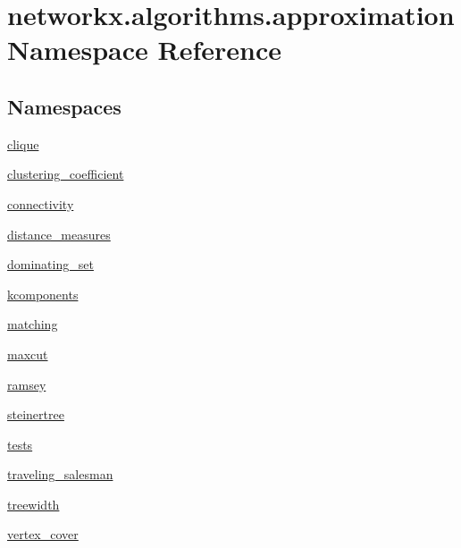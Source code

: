 \hypertarget{namespacenetworkx_1_1algorithms_1_1approximation}{}\section{networkx.\+algorithms.\+approximation Namespace Reference}
\label{namespacenetworkx_1_1algorithms_1_1approximation}
\subsection*{Namespaces}
\begin{DoxyCompactItemize}
\item 
 \hyperlink{namespacenetworkx_1_1algorithms_1_1approximation_1_1clique}{clique}
\item 
 \hyperlink{namespacenetworkx_1_1algorithms_1_1approximation_1_1clustering__coefficient}{clustering\+\_\+coefficient}
\item 
 \hyperlink{namespacenetworkx_1_1algorithms_1_1approximation_1_1connectivity}{connectivity}
\item 
 \hyperlink{namespacenetworkx_1_1algorithms_1_1approximation_1_1distance__measures}{distance\+\_\+measures}
\item 
 \hyperlink{namespacenetworkx_1_1algorithms_1_1approximation_1_1dominating__set}{dominating\+\_\+set}
\item 
 \hyperlink{namespacenetworkx_1_1algorithms_1_1approximation_1_1kcomponents}{kcomponents}
\item 
 \hyperlink{namespacenetworkx_1_1algorithms_1_1approximation_1_1matching}{matching}
\item 
 \hyperlink{namespacenetworkx_1_1algorithms_1_1approximation_1_1maxcut}{maxcut}
\item 
 \hyperlink{namespacenetworkx_1_1algorithms_1_1approximation_1_1ramsey}{ramsey}
\item 
 \hyperlink{namespacenetworkx_1_1algorithms_1_1approximation_1_1steinertree}{steinertree}
\item 
 \hyperlink{namespacenetworkx_1_1algorithms_1_1approximation_1_1tests}{tests}
\item 
 \hyperlink{namespacenetworkx_1_1algorithms_1_1approximation_1_1traveling__salesman}{traveling\+\_\+salesman}
\item 
 \hyperlink{namespacenetworkx_1_1algorithms_1_1approximation_1_1treewidth}{treewidth}
\item 
 \hyperlink{namespacenetworkx_1_1algorithms_1_1approximation_1_1vertex__cover}{vertex\+\_\+cover}
\end{DoxyCompactItemize}


